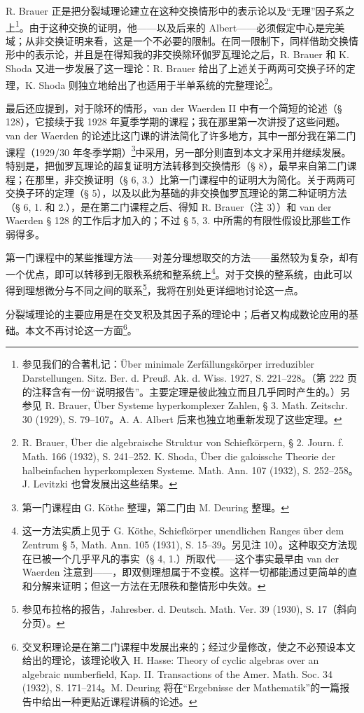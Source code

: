 R. Brauer 正是把分裂域理论建立在这种交换情形中的表示论以及“无理”因子系之上\footnote{参见我们的合著札记：Über minimale Zerfällungskörper irreduzibler Darstellungen. Sitz. Ber. d. Preuß. Ak. d. Wiss. 1927, S. 221--228。（第 222 页的注释含有一份“说明报告”。主要定理是彼此独立而且几乎同时产生的。）另参见 R. Brauer, Über Systeme hyperkomplexer Zahlen, § 3. Math. Zeitschr. 30 (1929), S. 79--107。A. A. Albert 后来也独立地重新发现了这些定理。}。由于这种交换的证明，他——以及后来的 Albert——必须假定中心是完美域；从非交换证明来看，这是一个不必要的限制。在同一限制下，同样借助交换情形中的表示论，并且是在得知我的非交换除环伽罗瓦理论之后，R. Brauer 和 K. Shoda 又进一步发展了这一理论：R. Brauer 给出了上述关于两两可交换子环的定理，K. Shoda 则独立地给出了也适用于半单系统的完整理论\footnote{R. Brauer, Über die algebraische Struktur von Schiefkörpern, § 2. Journ. f. Math. 166 (1932), S. 241--252. K. Shoda, Über die galoissche Theorie der halbeinfachen hyperkomplexen Systeme. Math. Ann. 107 (1932), S. 252--258。J. Levitzki 也曾发展出这些结果。}。

最后还应提到，对于除环的情形，van der Waerden II 中有一个简短的论述（§ 128），它接续于我 1928 年夏季学期的课程；我在那里第一次讲授了这些问题。van der Waerden 的论述比这门课的讲法简化了许多地方，其中一部分我在第二门课程（1929/30 年冬季学期）\footnote{第一门课程由 G. Köthe 整理，第二门由 M. Deuring 整理。}中采用，另一部分则直到本文才采用并继续发展。特别是，把伽罗瓦理论的超复证明方法转移到交换情形（§ 8），最早来自第二门课程；在那里，非交换证明（§ 6, 3.）比第一门课程中的证明大为简化。关于两两可交换子环的定理（§ 5），以及以此为基础的非交换伽罗瓦理论的第二种证明方法（§ 6, 1. 和 2.），是在第二门课程之后、得知 R. Brauer（注 3））和 van der Waerden § 128 的工作后才加入的；不过 § 5, 3. 中所需的有限性假设比那些工作弱得多。

第一门课程中的某些推理方法——对差分理想取交的方法——虽然较为复杂，却有一个优点，即可以转移到无限秩系统和整系统上\footnote{这一方法实质上见于 G. Köthe, Schiefkörper unendlichen Ranges über dem Zentrum § 5, Math. Ann. 105 (1931), S. 15--39。另见注 10）。这种取交方法现在已被一个几乎平凡的事实（§ 4, 1.）所取代——这个事实最早由 van der Waerden 注意到——，即双侧理想属于不变模。这样一切都能通过更简单的直和分解来证明；但这一方法在无限秩和整情形中失效。}。对于交换的整系统，由此可以得到理想微分与不同之间的联系\footnote{参见布拉格的报告，Jahresber. d. Deutsch. Math. Ver. 39 (1930), S. 17（斜向分页）。}，我将在别处更详细地讨论这一点。

分裂域理论的主要应用是在交叉积及其因子系的理论中；后者又构成数论应用的基础。本文不再讨论这一方面\footnote{交叉积理论是在第二门课程中发展出来的；经过少量修改，使之不必预设本文给出的理论，该理论收入 H. Hasse: Theory of cyclic algebras over an algebraic numberfield, Kap. II. Transactions of the Amer. Math. Soc. 34 (1932), S. 171--214。M. Deuring 将在“Ergebnisse der Mathematik”的一篇报告中给出一种更贴近课程讲稿的论述。}。

